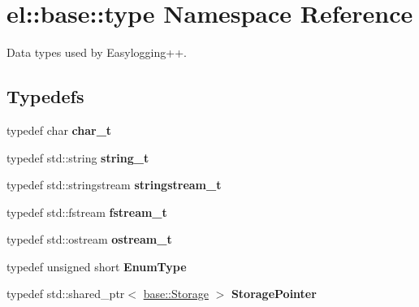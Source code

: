 \hypertarget{namespaceel_1_1base_1_1type}{}\section{el\+:\+:base\+:\+:type Namespace Reference}
\label{namespaceel_1_1base_1_1type}


Data types used by Easylogging++.  


\subsection*{Typedefs}
\begin{DoxyCompactItemize}
\item 
\mbox{\label{namespaceel_1_1base_1_1type_ae9fe1ba101c2444b8cad9a2484b54907}} 
typedef char {\bfseries char\+\_\+t}
\item 
\mbox{\label{namespaceel_1_1base_1_1type_a67e406cd213c231f1d135b5a4eda64b5}} 
typedef std\+::string {\bfseries string\+\_\+t}
\item 
\mbox{\label{namespaceel_1_1base_1_1type_a3492908c4b80f97b6c4b346d394f1302}} 
typedef std\+::stringstream {\bfseries stringstream\+\_\+t}
\item 
\mbox{\label{namespaceel_1_1base_1_1type_a620c830ead75d26b45c060c211ee2685}} 
typedef std\+::fstream {\bfseries fstream\+\_\+t}
\item 
\mbox{\label{namespaceel_1_1base_1_1type_a74ea109bf34d1c44926837fb0830f445}} 
typedef std\+::ostream {\bfseries ostream\+\_\+t}
\item 
\mbox{\label{namespaceel_1_1base_1_1type_afb892a99b7545bf6e45c1e1d84af2ec9}} 
typedef unsigned short {\bfseries Enum\+Type}
\item 
\mbox{\label{namespaceel_1_1base_1_1type_a3c34822c3825018aca1526f2289b7976}} 
typedef std\+::shared\+\_\+ptr$<$ \hyperlink{classel_1_1base_1_1_storage}{base\+::\+Storage} $>$ {\bfseries Storage\+Pointer}
\item 
\mbox{\label{namespaceel_1_1base_1_1type_a3f79fa74639a13c32f794ba074fe7fb4}} 

\end{DoxyCompactItemize}
